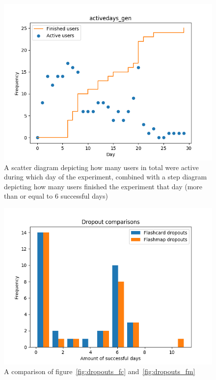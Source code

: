 \begin{figure}
    \centering
    \includegraphics[width=.7\textwidth]{img/activedays_gen.png}
    \caption{A scatter diagram depicting how many users in total were active during which day of the experiment, combined with a step diagram depicting how many users finished the experiment that day (more than or equal to 6 successful days)}
    \label{fig:activedays_gen}
\end{figure}

\begin{figure}[htbp]
    \centering
    \includegraphics[width=.7\textwidth]{img/dropouts.png}
    \caption{A comparison of figure~\protect\ref{fig:dropouts_fc} and~\protect\ref{fig:dropouts_fm}}
    \label{fig:dropouts}
\end{figure}
